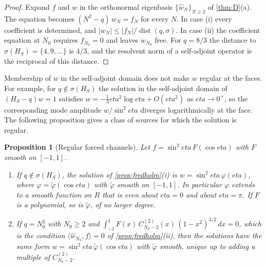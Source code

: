 \documentclass[11pt]{article}
\theoremstyle{canonmath}
\theoremstyle{canonpostulate}
\theoremstyle{canonproposition}
\theoremstyle{canonmath}
\newtheorem{proposition*}[theorem]{Proposition}
\theoremstyle{canonproposition}
\providecommand{\R}{\mathbb{R}}
\def\mathbb#1{#1}%
\def\mathcal#1{#1}%
\def\eta{eta}%
\begin{document}
\begin{proof}
Expand $f$ and $w$ in the orthonormal eigenbasis $\{\hat w_N\}_{N\ge2}$ of \cref{thm:D}(a). The equation becomes $(N^2-q)\,w_N = f_N$ for every $N$. In case (i) every coefficient is determined, and $|w_N|\le|f_N|/\operatorname{dist}(q,\sigma)$. In case (ii) the coefficient equation at $N_0$ requires $f_{N_0} = 0$ and leaves $w_{N_0}$ free. For $q = 8/3$ the distance to $\sigma(\mathcal{H}_S) = \{4,9,\dots\}$ is $4/3$, and the resolvent norm of a self-adjoint operator is the reciprocal of this distance.
\end{proof}

Membership of $w$ in the self-adjoint domain does not make $w$ regular at the faces. For example, for $q\notin\sigma(\mathcal{H}_S)$ the solution in the self-adjoint domain of $(\mathcal{H}_S - q)w = 1$ satisfies $w = -\tfrac13\eta^2\log\eta + O(\eta^2)$ as $\eta\to0^+$, so the corresponding mode amplitude $w/\sin^2\eta$ diverges logarithmically at the face. The following proposition gives a class of sources for which the solution is regular.

\begin{proposition*}[Regular forced channels]\label{prop:regforced}
Let $f = \sin^2\eta\,F(\cos\eta)$ with $F$ smooth on $[-1,1]$.
\begin{enumerate}[label=(\roman*)]
\item If $q\notin\sigma(\mathcal{H}_S)$, the solution of \cref{prop:fredholm}(i) is $w = \sin^2\eta\,\varphi(\eta)$, where $\varphi = \tilde\varphi(\cos\eta)$ with $\tilde\varphi$ smooth on $[-1,1]$. In particular $\varphi$ extends to a smooth function on $\R$ that is even about $\eta = 0$ and about $\eta = \pi$. If $F$ is a polynomial, so is $\tilde\varphi$, of no larger degree.
\item If $q = N_0^2$ with $N_0\ge2$ and $\int_{-1}^1F(x)\,C^{(2)}_{N_0-2}(x)\,(1-x^2)^{3/2}\,dx = 0$, which is the condition $\langle\hat w_{N_0},f\rangle = 0$ of \cref{prop:fredholm}(ii), then the solutions have the same form $w = \sin^2\eta\,\tilde\varphi(\cos\eta)$ with $\tilde\varphi$ smooth, unique up to adding a multiple of $C^{(2)}_{N_0-2}$.
\end{enumerate}
\end{proposition*}
\end{document}
